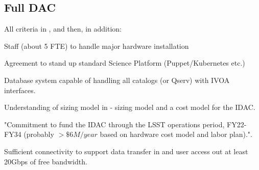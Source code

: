 \subsection{Full \gls{DAC}} \label{sec:fullDAC}
All criteria in , and then, in addition:
\begin{todolist}
\item Staff (about 5 \gls{FTE}) to handle major hardware installation
\item Agreement to stand up standard \gls{Science Platform} (Puppet/Kubernetes etc.)
\item Database system capable of handling all catalogs (or \gls{Qserv}) with \gls{IVOA}  interfaces.
\item Understanding of sizing model in  - sizing model and a cost model for the \gls{IDAC}.
\item "Commitment to fund the \gls{IDAC} through the \gls{LSST} operations period, FY22-FY34 (probably  $>\$6M/year$ based on hardware cost model and labor plan).".
\item Sufficient connectivity to support data transfer in and user access out at least 20Gbps of free bandwidth.
\end{todolist}

